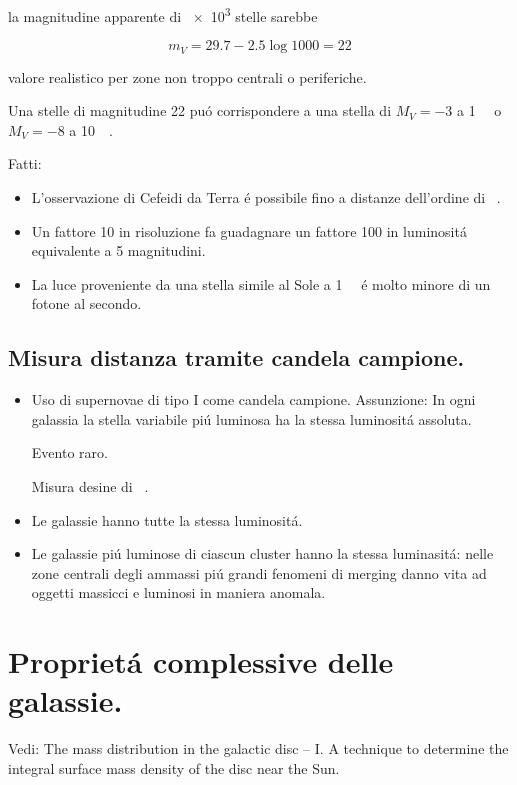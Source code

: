 \documentclass[main.tex]{subfiles}
\begin{document}
la magnitudine apparente di \num{e3} stelle sarebbe 

\begin{equation*}
m_V=29.7-2.5\log{1000}=22
\end{equation*}

valore realistico per zone non troppo centrali o periferiche.

Una stelle di magnitudine 22 pu\'o corrispondere a una stella di $M_V=-3$ a \SI{1}{\mega\parsec} o $M_V=-8$ a \SI{10}{\mega\parsec}.

Fatti:
\begin{itemize}
    \item L'osservazione di Cefeidi da Terra \'e possibile fino a distanze dell'ordine di \si{\mega\parsec}.
    \item Un fattore 10 in risoluzione fa guadagnare un fattore 100 in luminosit\'a equivalente a 5 magnitudini.
    \item La luce proveniente da una stella simile al Sole a \SI{1}{\mega\parsec} \'e molto minore di un fotone al secondo.
\end{itemize}


\subsection{Misura distanza tramite candela campione.}

\begin{itemize}
    \item Uso di supernovae di tipo I come candela campione. Assunzione: In ogni galassia la stella variabile pi\'u luminosa ha la stessa luminosit\'a assoluta.
    
    Evento raro.
    
    Misura desine di \si{\mega\parsec}.
    \item Le galassie hanno tutte la stessa luminosit\'a.
    \item Le galassie pi\'u luminose di ciascun cluster hanno la stessa luminasit\'a: nelle zone centrali degli ammassi pi\'u grandi fenomeni di merging danno vita ad oggetti massicci e luminosi in maniera anomala.
\end{itemize}

\section{Propriet\'a complessive delle galassie.}
Vedi: The mass distribution in the galactic disc – I. A technique to determine the integral surface mass density of the disc near the Sun.
\end{document}
